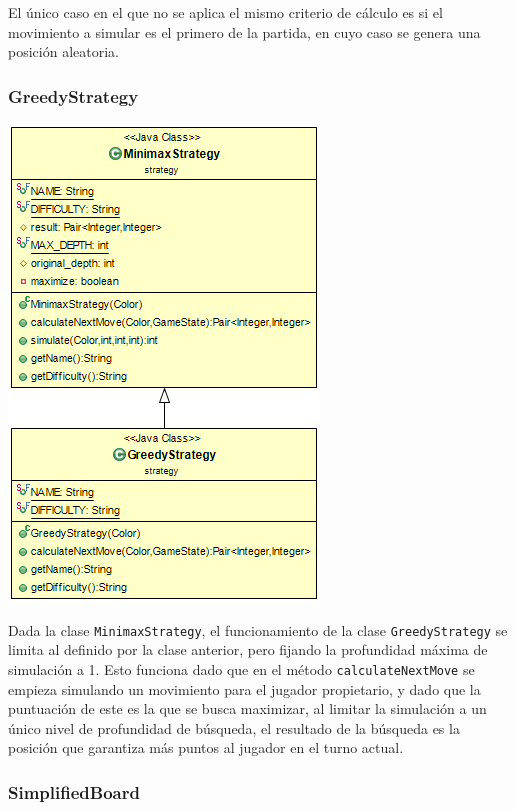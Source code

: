 \documentclass[12pt,a4paper,openright]{book}
\theoremstyle{break}
\begin{document}
El único caso en el que no se aplica el mismo criterio de cálculo es si el movimiento a simular es el primero de la partida, en cuyo caso se genera una posición aleatoria.

\newpage

\subsubsection{GreedyStrategy}

\begin{center}
\includegraphics[scale=0.75]{GreedyStrategy-sprint7.png} 
\end{center}

Dada la clase \texttt{MinimaxStrategy}, el funcionamiento de la clase \texttt{GreedyStrategy} se limita al definido por la clase anterior, pero fijando la profundidad máxima de simulación a 1. Esto funciona dado que en el método \texttt{calculateNextMove} se empieza simulando un movimiento para el jugador propietario, y dado que la puntuación de este es la que se busca maximizar, al limitar la simulación a un único nivel de profundidad de búsqueda, el resultado de la búsqueda es la posición que garantiza más puntos al jugador en el turno actual.

\newpage

\subsubsection{SimplifiedBoard}
\end{document}
